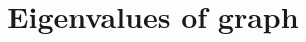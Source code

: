 \documentclass[12pt]{article}
\newcommand\setTBstruts{\def\T{\rule{0pt}{2.6ex}}%
\def\B{\rule[-1.2ex]{0pt}{0pt}}}
\begin{document}
 
\setTBstruts



{\allowdisplaybreaks%






\title{Eigenvalues of graph}
\author{}%
\maketitle%
%



}
\end{document}
